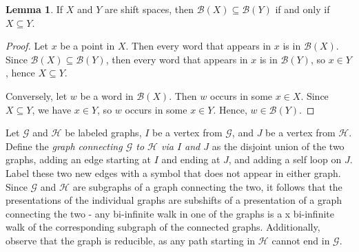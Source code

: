 \documentclass{article}
\newcommand{\Lc}{\mathcal{L}}  %
\newcommand{\Gc}{\mathcal{G}}  %
\newcommand{\Hc}{\mathcal{H}}  %
\newcommand{\Bc}{\mathcal{B}}
\newcommand{\shift}[1]{\mathsf{X}_{#1}}
\newcommand{\term}[1]{\textit{#1}}
\theoremstyle{definition}
\newtheorem{lemma}{Lemma}
\begin{document}

    \begin{lemma}
        If \(X\) and \(Y\) are shift spaces, then \(\Bc(X) \subseteq \Bc(Y)\) if and only if \(X \subseteq Y\).
    \end{lemma}

    \begin{proof}
        Let \(x\) be a point in \(X\). Then every word that appears in \(x\) is in \(\Bc(X)\). Since 
        \(\Bc(X) \subseteq \Bc(Y)\), then every word that appears in \(x\) is in \(\Bc(Y)\),
        so \(x \in Y\), hence \(X \subseteq Y\).

        Conversely, let \(w\) be a word in \(\Bc(X)\). Then \(w\) occurs in some \(x \in X\). 
        Since \(X \subseteq Y\), we have \(x \in Y\), so \(w\) occurs in some \(x \in Y\). Hence, \(w \in \Bc(Y)\).
    \end{proof}

    Let \(\Gc\) and \(\Hc\) be labeled graphs, \(I\) be a vertex from \(\Gc\), and \(J\) 
    be a vertex from \(\Hc\). Define the \term{graph connecting \(\Gc\) to \(\Hc\) via \(I\) and \(J\)} 
    as the disjoint union of the two graphs, adding an edge starting at \(I\) and ending at \(J\), 
    and adding a self loop on \(J\). Label these two new edges with a symbol that 
    does not appear in either graph. 
    Since \(\Gc\) and \(\Hc\) are subgraphs of a graph connecting the two,
    it follows that the presentations of the individual graphs are subshifts of a presentation 
    of a graph connecting the two - any bi-infinite walk in one of the graphs is a x
    bi-infinite walk of the corresponding subgraph of the connected graphs.
    Additionally, observe that the graph is reducible,
    as any path starting in \(\Hc\) cannot end in \(\Gc\).
    
\end{document}

